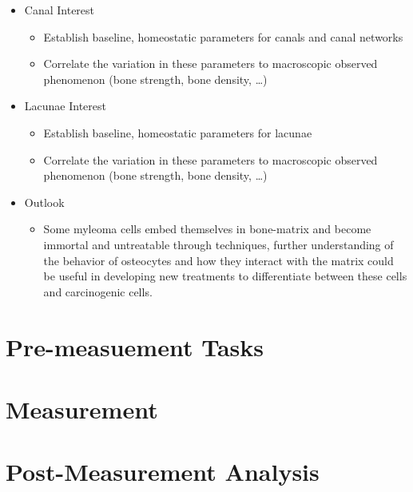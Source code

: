 \documentclass[a4paper,10pt]{article}
\begin{document}
\begin{itemize}
 	\item Canal Interest
	\begin{itemize}
		\item Establish baseline, homeostatic parameters for canals and canal networks
		\item Correlate the variation in these parameters to macroscopic observed phenomenon (bone strength, bone density, …)
	\end{itemize}
	\item Lacunae Interest
	\begin{itemize}
		\item Establish baseline, homeostatic parameters for lacunae
		\item Correlate the variation in these parameters to macroscopic observed phenomenon (bone strength, bone density, …)
	\end{itemize}
	\item Outlook
	\begin{itemize}
		\item Some myleoma cells embed themselves in bone-matrix and become immortal and untreatable through techniques, further understanding of the behavior of osteocytes and how they interact with the matrix could be useful in developing new treatments to differentiate between these cells and carcinogenic cells.
	\end{itemize}
\end{itemize}








\newpage
\section{Pre-measuement Tasks}


\newpage
\section{Measurement}


\newpage
\section{Post-Measurement Analysis}

\end{document}
